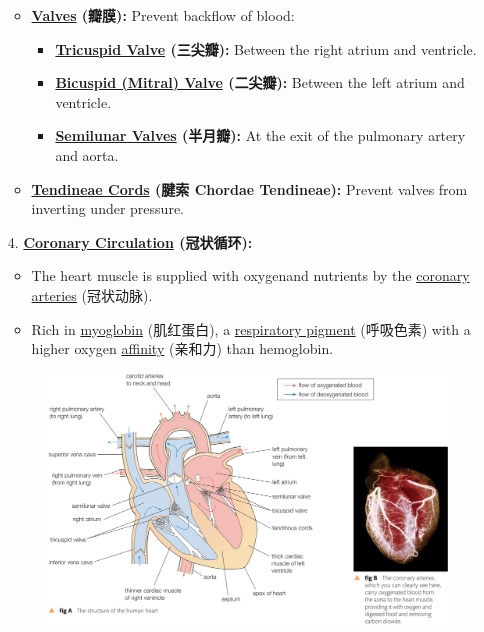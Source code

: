 \begin{itemize}
\begin{itemize}
        \item \textbf{\underline{Valves} (瓣膜):} Prevent backflow of blood:
        \begin{itemize}
            \item \textbf{\underline{Tricuspid Valve} (三尖瓣):} Between the right atrium and ventricle.
            \item \textbf{\underline{Bicuspid (Mitral) Valve} (二尖瓣):} Between the left atrium and ventricle.
            \item \textbf{\underline{Semilunar Valves} (半月瓣):} At the exit of the pulmonary artery and aorta.
        \end{itemize}
        \item \textbf{\underline{Tendineae Cords} (腱索 Chordae Tendineae):} Prevent valves from inverting under pressure.
    \end{itemize}
    \item[4.] \textbf{\underline{Coronary Circulation} (冠状循环):}
    \begin{itemize}
        \item The heart muscle is supplied with oxygenand nutrients by the \underline{coronary arteries} (冠状动脉).
        \item Rich in \underline{myoglobin} (肌红蛋白), a \underline{respiratory pigment} (呼吸色素) with a higher oxygen
        \underline{affinity} (亲和力) than hemoglobin.
    \end{itemize}
    \begin{figure}[H]
        \centering
        \includegraphics[scale=0.25]{Biology/1B/Images/1B-4-1.png}
    \end{figure}
\end{itemize}

